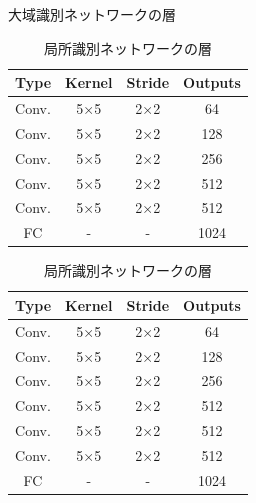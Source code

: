 \documentclass[a4j, 11pt]{jreport}
\begin{document}
\begin{table}[H]
	\begin{minipage}[t]{0.5\hsize}
		\begin{center}
			\caption{大域識別ネットワークの層}
			\label{tb:global_discriminator}
			\begin{tabular}{cccc}
				\hline
				Type  & Kernel & Stride & Outputs \\ \hline
				Conv. & 5×5    & 2×2    & 64      \\ 
				Conv. & 5×5    & 2×2    & 128     \\ 
				Conv. & 5×5    & 2×2    & 256     \\ 
				Conv. & 5×5    & 2×2    & 512     \\ 
				Conv. & 5×5    & 2×2    & 512     \\ \hline
				FC    & -      & -      & 1024    \\ \hline
			\end{tabular}
		\end{center}
	\end{minipage}
	\begin{minipage}[t]{0.5\hsize}
		\begin{center}
			\caption{局所識別ネットワークの層}
			\label{tb:local_discriminator}
			\begin{tabular}{cccc}
				\hline
				Type  & Kernel & Stride & Outputs \\ \hline
				Conv. & 5×5    & 2×2    & 64      \\ 
				Conv. & 5×5    & 2×2    & 128     \\ 
				Conv. & 5×5    & 2×2    & 256     \\ 
				Conv. & 5×5    & 2×2    & 512     \\ 
				Conv. & 5×5    & 2×2    & 512     \\ 
				Conv. & 5×5    & 2×2    & 512     \\ \hline
				FC    & -      & -      & 1024    \\ \hline
			\end{tabular}
		\end{center}
	\end{minipage}
\end{table}
\end{document}
